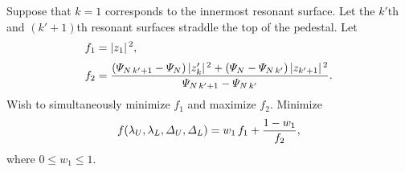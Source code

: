 \documentclass[12pt]{article}
\begin{document}
Suppose that $k=1$ corresponds to the innermost resonant surface. Let the $k'$th and $(k'+1)$th resonant surfaces straddle the top of the
pedestal. 
Let
\begin{align}
f_1 &=|z_1|^{\,2},\\[0.5ex]
f_2 &=\frac{ ({\mit\Psi}_{N\,k'+1}  - {\mit\Psi}_N)\,|z_k'|^{\,2} + ({\mit\Psi}_N - {\mit\Psi}_{N\,k'})\,|z_{k'+1}|^{\,2}}{{\mit\Psi}_{N\,k'+1}-{\mit\Psi}_{N\,k'}}.
\end{align}
Wish to simultaneously minimize $f_1$ and maximize $f_2$. Minimize
\begin{equation}
f (\lambda_U,\lambda_L,{\mit\Delta}_U,{\mit\Delta}_L)= w_1\,f_1+ \frac{1-w_1}{f_2},
\end{equation}
where $0\leq w_1\leq 1$. 
\end{document}
